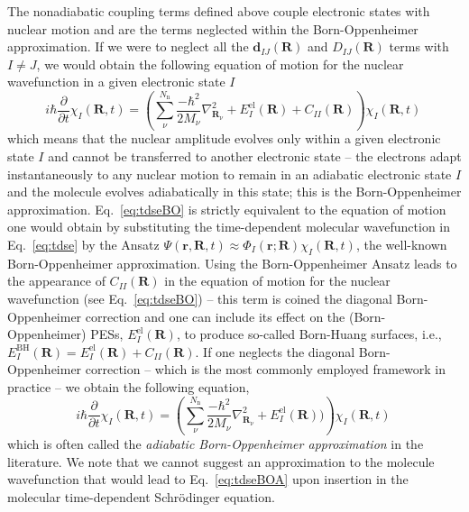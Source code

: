 \documentclass[9pt,bestpractices]{livecoms}
\begin{document}
The nonadiabatic coupling terms defined above couple electronic states with nuclear motion and are the terms neglected within the Born-Oppenheimer approximation. If we were to neglect all the $\mathbf{d}_{IJ}(\mathbf{R})$ and  $D_{IJ}(\mathbf{R})$ terms with $I \neq J$, we would obtain the following equation of motion for the nuclear wavefunction in a given electronic state $I$  
\begin{equation}
i\hbar\frac{\partial}{\partial t} \chi_I(\mathbf{R},t)  = \left(\sum_\nu^{N_{\text{n}}}\frac{-\hbar^2}{2M_\nu} \nabla_{\mathbf{R}_\nu}^2 + E^{\text{el}}_{I}(\mathbf{R}) + C_{II}(\mathbf{R}) \right) \chi_I(\mathbf{R},t) \, 
\label{eq:tdseBO}
\end{equation}
which means that the nuclear amplitude evolves only within a given electronic state $I$ and cannot be transferred to another electronic state -- the electrons adapt instantaneously to any nuclear motion to remain in an adiabatic electronic state $I$ and the molecule evolves adiabatically in this state; this is the Born-Oppenheimer approximation. Eq.~\eqref{eq:tdseBO} is strictly equivalent to the equation of motion one would obtain by substituting the time-dependent molecular wavefunction in Eq.~\eqref{eq:tdse} by the Ansatz $\Psi(\mathbf{r},\mathbf{R},t) \approx \Phi_I(\mathbf{r};\mathbf{R})\chi_I(\mathbf{R},t)$, the well-known Born-Oppenheimer approximation. Using the Born-Oppenheimer Ansatz leads to the appearance of  $C_{II}(\mathbf{R})$ in the equation of motion for the nuclear wavefunction (see Eq.~\eqref{eq:tdseBO}) -- this term is coined the diagonal Born-Oppenheimer correction and one can include its effect on the (Born-Oppenheimer) PESs, $E^{\text{el}}_{I}(\mathbf{R})$, to produce so-called Born-Huang surfaces, i.e., $E^{\text{BH}}_{I}(\mathbf{R}) = E^{\text{el}}_{I}(\mathbf{R}) + C_{II}(\mathbf{R})$.\cite{Levine_JCP2016,hush2017cusp,ibele2021diabolical} If one neglects the diagonal Born-Oppenheimer correction -- which is the most commonly employed framework in practice -- we obtain the following equation, 
\begin{equation}
i\hbar\frac{\partial}{\partial t} \chi_I(\mathbf{R},t)  = \left(\sum_\nu^{N_{\text{n}}}\frac{-\hbar^2}{2M_\nu} \nabla_{\mathbf{R}_\nu}^2 + E^{\text{el}}_{I}(\mathbf{R}) ) \right) \chi_I(\mathbf{R},t) \, 
\label{eq:tdseBOA}
\end{equation}
which is often called the \textit{adiabatic Born-Oppenheimer approximation} in the literature.\cite{worth2004beyond} We note that we cannot suggest an approximation to the molecule wavefunction that would lead to Eq.~\eqref{eq:tdseBOA} upon insertion in the molecular time-dependent Schr\"{o}dinger equation.
\end{document}
